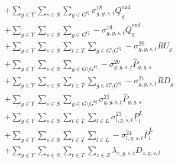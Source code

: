 \documentclass{article}
\newcommand{\sGenerators}{G}
\newcommand{\sStorage}{G^{\mathrm{Q}}}
\newcommand{\sStorageCandidate}{G^{\mathrm{C,Q}}}
\newcommand{\sYears}{Y}
\newcommand{\sScenarios}{S}
\newcommand{\sIntervals}{T}
\newcommand{\sZones}{Z}
\newcommand{\sLinks}{L}
\newcommand{\iGenerator}{g}
\newcommand{\iYear}{y}
\newcommand{\iScenario}{s}
\newcommand{\iInterval}{t}
\newcommand{\iIntervalStart}{\underline{\iInterval}}
\newcommand{\iZone}{z}
\newcommand{\iLink}{l}
\newcommand{\cRampRateUp}[1][\iGenerator]{RU_{#1}}
\newcommand{\cRampRateDown}[1][\iGenerator]{RD_{#1}}
\newcommand{\cStorageUnitEnergyIntervalEndMax}[1][\iGenerator]{\overline{Q}^{\mathrm{end}}_{#1}}
\newcommand{\cStorageUnitEnergyIntervalEndMin}[1][\iGenerator]{\underline{Q}^{\mathrm{end}}_{#1}}
\newcommand{\cDemand}[1][\iZone,\iYear,\iScenario,\iInterval]{D_{#1}}
\newcommand{\cPowerFlowMin}{\underline{P}_{\iLink}^{L}}
\newcommand{\cPowerFlowMax}{\overline{P}_{\iLink}^{L}}
\newcommand{\cPowerInitial}[1][\iGenerator,\iYear,\iScenario]{\hat{P}_{#1}}
\newcommand{\vStorageUnitEnergy}[1][\iGenerator,\iYear,\iScenario,\iInterval]{q_{#1}}
\newcommand{\vLostLoadPower}[1][\iZone,\iYear,\iScenario,\iInterval]{p^{\mathrm{V}}_{#1}}
\newcommand{\vInstalledCapacityTotal}[1][\iGenerator,\iYear]{a_{#1}}
\newcommand{\dMaxStorageEnergyCandidate}[1][\iGenerator,\iYear,\iScenario,\iInterval]{\sigma_{#1}^{17}}
\newcommand{\dMinStorageEnergyIntervalEnd}[1][\iGenerator,\iYear,\iScenario,\iInterval]{\sigma_{#1}^{18}}
\newcommand{\dMaxStorageEnergyIntervalEnd}[1][\iGenerator,\iYear,\iScenario,\iInterval]{\sigma_{#1}^{19}}
\newcommand{\dRampRateUp}[1][\iGenerator,\iYear,\iScenario,\iInterval]{\sigma_{#1}^{20}}
\newcommand{\dRampRateDown}[1][\iGenerator,\iYear,\iScenario,\iInterval]{\sigma_{#1}^{21}}
\newcommand{\dNonNegativeLostLoad}[1][\iZone,\iYear,\iScenario,\iInterval]{\sigma_{#1}^{22}}
\newcommand{\dMinPowerFlow}[1][\iLink,\iYear,\iScenario,\iInterval]{\sigma_{#1}^{23}}
\newcommand{\dMaxPowerFlow}[1][\iLink,\iYear,\iScenario,\iInterval]{\sigma_{#1}^{24}}
\newcommand{\dPowerBalance}[1][\iZone,\iYear,\iScenario,\iInterval]{\lambda_{#1}}
\begin{document}
\begin{align}
\begin{split}
& + \sum\limits_{\iYear \in \sYears}\sum\limits_{\iScenario \in \sScenarios} \sum\limits_{\iGenerator \in \sStorage} \dMinStorageEnergyIntervalEnd \cStorageUnitEnergyIntervalEndMin\\
& + \sum\limits_{\iYear \in \sYears}\sum\limits_{\iScenario \in \sScenarios} \sum\limits_{\iGenerator \in \sStorage} - \dMaxStorageEnergyIntervalEnd \cStorageUnitEnergyIntervalEndMax\\
& + \sum\limits_{\iYear \in \sYears}\sum\limits_{\iScenario \in \sScenarios}\sum\limits_{\iInterval \in \sIntervals} \sum\limits_{\iGenerator \in \sGenerators \setminus \sStorage} - \dRampRateUp \cRampRateUp\\
& + \sum\limits_{\iYear \in \sYears}\sum\limits_{\iScenario \in \sScenarios} \sum\limits_{\iGenerator \in \sGenerators \setminus \sStorage} - \dRampRateUp[\iGenerator,\iYear,\iScenario,\iIntervalStart] \cPowerInitial\\
& + \sum\limits_{\iYear \in \sYears}\sum\limits_{\iScenario \in \sScenarios}\sum\limits_{\iInterval \in \sIntervals} \sum\limits_{\iGenerator \in \sGenerators \setminus \sStorage} - \dRampRateDown \cRampRateDown\\
& + \sum\limits_{\iYear \in \sYears}\sum\limits_{\iScenario \in \sScenarios} \sum\limits_{\iGenerator \in \sGenerators \setminus \sStorage} \dRampRateDown[\iGenerator,\iYear,\iScenario,\iIntervalStart] \cPowerInitial\\
& + \sum\limits_{\iYear \in \sYears}\sum\limits_{\iScenario \in \sScenarios}\sum\limits_{\iInterval \in \sIntervals} \sum\limits_{\iLink \in \sLinks} \dMinPowerFlow \cPowerFlowMin\\
& + \sum\limits_{\iYear \in \sYears}\sum\limits_{\iScenario \in \sScenarios}\sum\limits_{\iInterval \in \sIntervals} \sum\limits_{\iLink \in \sLinks} - \dMaxPowerFlow \cPowerFlowMax\\
& + \sum\limits_{\iYear \in \sYears}\sum\limits_{\iScenario \in \sScenarios}\sum\limits_{\iInterval \in \sIntervals} \sum\limits_{\iZone \in \sZones} \dPowerBalance \cDemand\\

\end{split}
\end{align}
\end{document}
